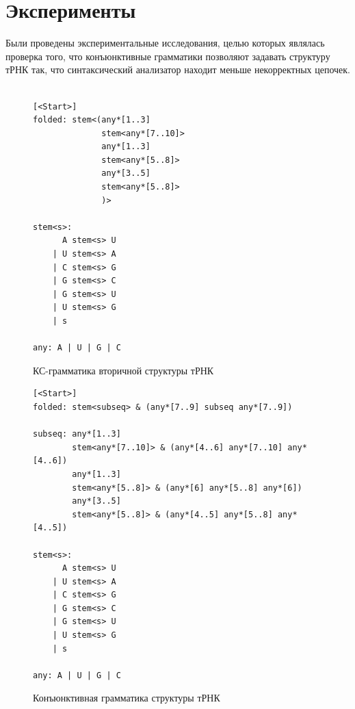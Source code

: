 \documentclass[14pt]{matmex-diploma-custom}
\begin{document}
\section{Эксперименты}

Были проведены экспериментальные исследования, целью которых являлась проверка того, что конъюнктивные грамматики позволяют задавать структуру тРНК так, что синтаксический анализатор находит меньше некорректных цепочек.

\begin{figure}[h]
\begin{center}
\begin{verbatim}

[<Start>]
folded: stem<(any*[1..3] 
              stem<any*[7..10]> 
              any*[1..3] 
              stem<any*[5..8]> 
              any*[3..5] 
              stem<any*[5..8]>
              )>

stem<s>: 
      A stem<s> U
    | U stem<s> A
    | C stem<s> G
    | G stem<s> C
    | G stem<s> U
    | U stem<s> G
    | s

any: A | U | G | C

\end{verbatim}
\caption{КС-грамматика вторичной структуры тРНК}
\label{TRNAgrammar}
\end{center}
\end{figure}

\begin{figure}
\begin{center}
\begin{verbatim}
[<Start>]
folded: stem<subseq> & (any*[7..9] subseq any*[7..9])

subseq: any*[1..3] 
        stem<any*[7..10]> & (any*[4..6] any*[7..10] any*[4..6])
        any*[1..3] 
        stem<any*[5..8]> & (any*[6] any*[5..8] any*[6])
        any*[3..5] 
        stem<any*[5..8]> & (any*[4..5] any*[5..8] any*[4..5])
        
stem<s>:
      A stem<s> U
    | U stem<s> A
    | C stem<s> G
    | G stem<s> C
    | G stem<s> U
    | U stem<s> G
    | s

any: A | U | G | C

\end{verbatim}
\caption{Конъюнктивная грамматика структуры тРНК}
\label{TRNAgrammarConj}
\end{center}
\end{figure}
\end{document}
